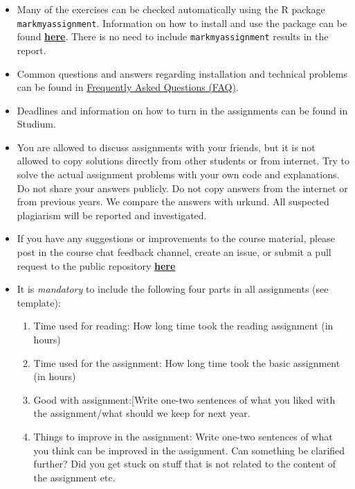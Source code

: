 \begin{itemize}
\begin{enumerate}
\end{enumerate}
\item Many of the exercises can be checked automatically using the R package \\ \texttt{markmyassignment}. Information on how to install and use the package can be found \href{https://cran.r-project.org/web/packages/markmyassignment/vignettes/markmyassignment.html}{\textbf{here}}. There is no need to include \texttt{markmyassignment} results in the report.
\item Common questions and answers regarding installation and technical problems can be found in \href{https://github.com/MansMeg/BSDA/blob/main/FAQ.md}{Frequently Asked Questions (FAQ)}.
\item Deadlines and information on how to turn in the assignments can be found in Studium.
\item You are allowed to discuss assignments with your friends, but it is not allowed to copy solutions directly from other students or from internet. Try to solve the actual assignment problems with your own code and explanations. Do not share your answers publicly. Do not copy answers from the internet or from previous years. We compare the answers with urkund. All suspected plagiarism will be reported and investigated.
\item If you have any suggestions or improvements to the course material, please post in the course chat feedback channel, create an issue, or submit a pull request to the public repository \href{https://github.com/MansMeg/BSDA/issues}{\textbf{here}}
\item It is \emph{mandatory} to include the following four parts in all assignments (see template):
\begin{enumerate}
\item Time used for reading: How long time took the reading assignment (in hours)
\item Time used for the assignment: How long time took the basic assignment (in hours)
\item Good with assignment:[Write one-two sentences of what you liked with the assignment/what should we keep for next year.
\item Things to improve in the assignment: Write one-two sentences of what you think can be improved in the assignment. Can something be clarified further? Did you get stuck on stuff that is not related to the content of the assignment etc.
\end{enumerate}
\end{itemize}


